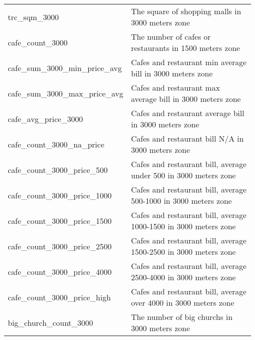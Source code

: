 \begin{longtable}[c]{ll}
    trc\_sqm\_3000                             & The square of shopping malls in 3000 meters zone                                                                          \\
    cafe\_count\_3000                          & The number of cafes or restaurants in 1500 meters zone                                                                    \\
    cafe\_sum\_3000\_min\_price\_avg           & Cafes and restaurant min average bill in 3000 meters zone                                                                 \\
    cafe\_sum\_3000\_max\_price\_avg           & Cafes and restaurant max average bill in 3000 meters zone                                                                 \\
    cafe\_avg\_price\_3000                     & Cafes and restaurant average bill in 3000 meters zone                                                                     \\
    cafe\_count\_3000\_na\_price               & Cafes and restaurant bill N/A in 3000 meters zone                                                                         \\
    cafe\_count\_3000\_price\_500              & Cafes and restaurant bill, average under 500 in 3000 meters zone                                                          \\
    cafe\_count\_3000\_price\_1000             & Cafes and restaurant bill, average  500-1000 in 3000 meters zone                                                          \\
    cafe\_count\_3000\_price\_1500             & Cafes and restaurant bill, average  1000-1500 in 3000 meters zone                                                         \\
    cafe\_count\_3000\_price\_2500             & Cafes and restaurant bill, average  1500-2500 in 3000 meters zone                                                         \\
    cafe\_count\_3000\_price\_4000             & Cafes and restaurant bill, average  2500-4000 in 3000 meters zone                                                         \\
    cafe\_count\_3000\_price\_high             & Cafes and restaurant bill, average  over 4000 in 3000 meters zone                                                         \\
    big\_church\_count\_3000                   & The number of big churchs in 3000 meters zone                                                                             \\

\end{longtable}
